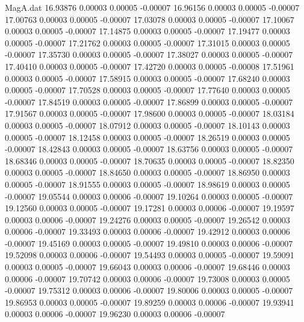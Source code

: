 \begin{filecontents}{MagA.dat}
  16.93876    0.00003    0.00005   -0.00007
  16.96156    0.00003    0.00005   -0.00007
  17.00763    0.00003    0.00005   -0.00007
  17.03078    0.00003    0.00005   -0.00007
  17.10067    0.00003    0.00005   -0.00007
  17.14875    0.00003    0.00005   -0.00007
  17.19477    0.00003    0.00005   -0.00007
  17.21762    0.00003    0.00005   -0.00007
  17.31015    0.00003    0.00005   -0.00007
  17.35730    0.00003    0.00005   -0.00007
  17.38027    0.00003    0.00005   -0.00007
  17.40410    0.00003    0.00005   -0.00007
  17.42720    0.00003    0.00005   -0.00008
  17.51961    0.00003    0.00005   -0.00007
  17.58915    0.00003    0.00005   -0.00007
  17.68240    0.00003    0.00005   -0.00007
  17.70528    0.00003    0.00005   -0.00007
  17.77640    0.00003    0.00005   -0.00007
  17.84519    0.00003    0.00005   -0.00007
  17.86899    0.00003    0.00005   -0.00007
  17.91567    0.00003    0.00005   -0.00007
  17.98600    0.00003    0.00005   -0.00007
  18.03184    0.00003    0.00005   -0.00007
  18.07912    0.00003    0.00005   -0.00007
  18.10143    0.00003    0.00005   -0.00007
  18.12458    0.00003    0.00005   -0.00007
  18.26519    0.00003    0.00005   -0.00007
  18.42843    0.00003    0.00005   -0.00007
  18.63756    0.00003    0.00005   -0.00007
  18.68346    0.00003    0.00005   -0.00007
  18.70635    0.00003    0.00005   -0.00007
  18.82350    0.00003    0.00005   -0.00007
  18.84650    0.00003    0.00005   -0.00007
  18.86950    0.00003    0.00005   -0.00007
  18.91555    0.00003    0.00005   -0.00007
  18.98619    0.00003    0.00005   -0.00007
  19.05544    0.00003    0.00006   -0.00007
  19.10264    0.00003    0.00005   -0.00007
  19.12560    0.00003    0.00005   -0.00007
  19.17281    0.00003    0.00006   -0.00007
  19.19597    0.00003    0.00006   -0.00007
  19.24276    0.00003    0.00005   -0.00007
  19.26542    0.00003    0.00006   -0.00007
  19.33493    0.00003    0.00006   -0.00007
  19.42912    0.00003    0.00006   -0.00007
  19.45169    0.00003    0.00005   -0.00007
  19.49810    0.00003    0.00006   -0.00007
  19.52098    0.00003    0.00006   -0.00007
  19.54493    0.00003    0.00005   -0.00007
  19.59091    0.00003    0.00005   -0.00007
  19.66043    0.00003    0.00006   -0.00007
  19.68446    0.00003    0.00006   -0.00007
  19.70742    0.00003    0.00006   -0.00007
  19.73008    0.00003    0.00005   -0.00007
  19.75312    0.00003    0.00006   -0.00007
  19.80006    0.00003    0.00005   -0.00007
  19.86953    0.00003    0.00005   -0.00007
  19.89259    0.00003    0.00006   -0.00007
  19.93941    0.00003    0.00006   -0.00007
  19.96230    0.00003    0.00006   -0.00007

\end{filecontents}
